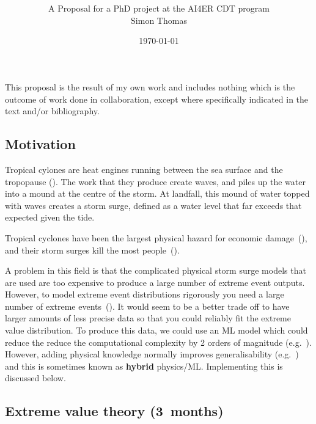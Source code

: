 \documentclass[usenames, dvipsnames]{article}      %
\title{\vspace*{-100pt}\textbf{\mytitle}\vspace{-15pt}}
\date{\vspace{-10pt}\today \vspace{-15pt}}
\author{A Proposal for a PhD project 
at the AI4ER CDT program\\
Simon Thomas
}
\begin{document}
\maketitle

\vspace{-10pt}%

\footnotesize{
This proposal is the result of my own work and includes nothing which is the outcome of work done in collaboration, except where specifically indicated in the text and/or bibliography.}

\vspace{-10pt}

\subsection*{ Motivation}

Tropical cylones are heat engines 
running between the sea surface and the tropopause
(\cite{emanuel1986air, emanuel1987dependence}). 
The work that they produce create waves, 
and piles up the water into a mound at the centre of the storm. 
At landfall, this mound of water topped with waves creates
a storm surge, defined as a water level that 
far exceeds that expected given the tide.


Tropical cyclones have been the
largest physical hazard for economic 
damage~(\cite{Chavas2013U.S.Perspective}),
and their storm surges kill the most
people~(\cite{shultz2005epidemiology,Mayo2019PredictingResilience}).

A problem in this field is that the
complicated physical storm surge models that
are used are too expensive 
to produce a large number of extreme event outputs.
However, to model extreme event distributions rigorously
you need a large number of extreme
events~(\cite{taleb2019statistical}).
It would seem to be a better trade off to have larger 
amounts of less precise data so that you could reliably
fit the extreme value distribution.
To produce this data, we could use an ML model
which could reduce the reduce the 
computational complexity by 2 orders of magnitude
(e.g.~\cite{Guo2021Data-drivenNetworks}).
However, adding physical knowledge normally improves generalisability
(e.g.~\cite{beucler2019achieving}) and this is sometimes
known as \textbf{hybrid} physics/ML.
Implementing this is discussed below.

\vspace{-10pt}

\subsection*{Extreme value theory (3~months)}
\end{document}
